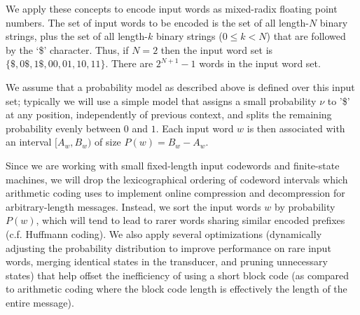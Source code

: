 \documentclass[english]{article}
\begin{document}
We apply these concepts to encode input words as mixed-radix floating point numbers.
The set of input words to be encoded is the set of all length-$N$ binary strings,
plus the set of all length-$k$ binary strings ($0 \leq k < N$) that are followed by the `\$' character.
Thus, if $N=2$ then the input word set is $\{\$,0\$,1\$,00,01,10,11\}$.
There are $2^{N+1}-1$ words in the input word set.

We assume that a probability model as described above is defined over this input set;
typically we will use a simple model that assigns a small probability $\nu$ to '\$' at any position,
independently of previous context,
and splits the remaining probability evenly between $0$ and $1$.
Each input word $w$ is then associated with an interval $[A_w,B_w)$ of size $P(w) = B_w-A_w$.

Since we are working with small fixed-length input codewords and finite-state machines, we will drop the lexicographical ordering of codeword intervals
which arithmetic coding uses to implement online compression and decompression for arbitrary-length messages.
Instead, we sort the input words $w$ by probability $P(w)$, which will tend to lead to rarer words sharing similar encoded prefixes
(c.f. Huffmann coding).
We also apply several optimizations (dynamically adjusting the probability distribution to improve performance on rare input words,
merging identical states in the transducer, and pruning unnecessary states) that help offset the inefficiency of using a short block code
(as compared to arithmetic coding where the block code length is effectively the length of the entire message).
\end{document}
